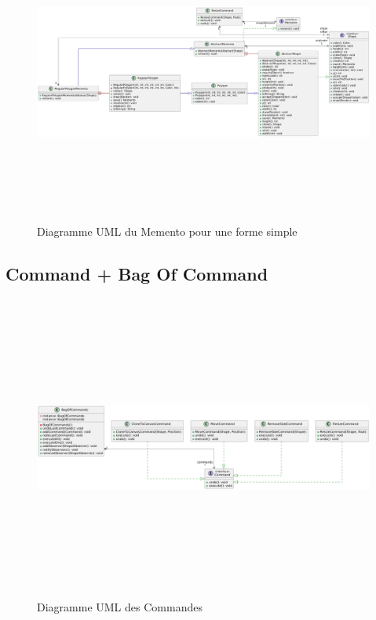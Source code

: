 \documentclass{article}
\begin{document}
\begin{figure}[h]
    \centering
    \includegraphics[width=\textwidth,height=10.0cm,keepaspectratio]{memento2.png}
    \caption{Diagramme UML du Memento pour une forme simple}
    \label{MementoShape}
\end{figure}
\FloatBarrier

\subsection{Command + Bag Of Command} \label{BoC}

\begin{figure}[h]
    \centering
    \includegraphics[width=\textwidth,height=10.0cm,keepaspectratio]{command.png}
    \caption{Diagramme UML des Commandes}
    \label{Command}
\end{figure}
\FloatBarrier
\end{document}
